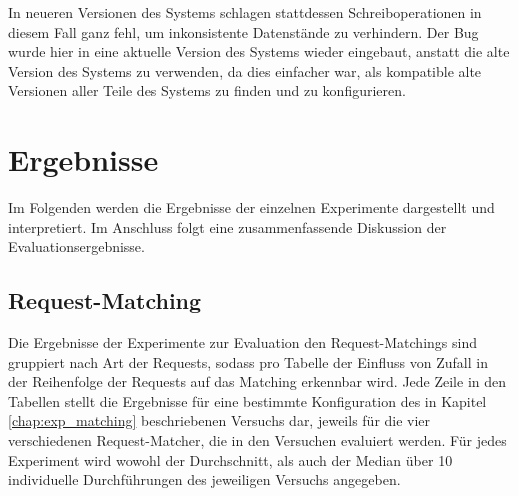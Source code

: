 \documentclass[12pt,a4paper]{report}
\begin{document}
In neueren Versionen des Systems schlagen stattdessen Schreiboperationen in diesem Fall ganz fehl, um inkonsistente Datenstände zu
verhindern. Der Bug wurde hier in eine aktuelle Version des Systems wieder eingebaut, anstatt die alte Version des Systems zu
verwenden, da dies einfacher war, als kompatible alte Versionen aller Teile des Systems zu finden und zu konfigurieren.



\chapter{Ergebnisse}
\label{chap:results}
Im Folgenden werden die Ergebnisse der einzelnen Experimente dargestellt und interpretiert. Im Anschluss folgt eine
zusammenfassende Diskussion der Evaluationsergebnisse.

\section{Request-Matching}
Die Ergebnisse der Experimente zur Evaluation den Request-Matchings sind gruppiert nach Art der Requests, sodass pro Tabelle
der Einfluss von Zufall in der Reihenfolge der Requests auf das Matching erkennbar wird.
Jede Zeile in den Tabellen stellt die Ergebnisse für eine bestimmte Konfiguration des in Kapitel \ref{chap:exp_matching}
beschriebenen Versuchs dar, jeweils für die vier verschiedenen Request-Matcher, die in den Versuchen evaluiert werden. Für jedes Experiment
wird wowohl der Durchschnitt, als auch der Median über 10 individuelle Durchführungen des jeweiligen Versuchs angegeben.
\end{document}
